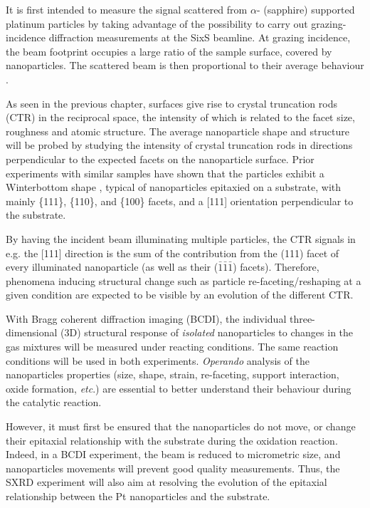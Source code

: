 It is first intended to measure the signal scattered from $\alpha$- (sapphire) supported platinum particles by taking advantage of the possibility to carry out grazing-incidence diffraction measurements at the SixS beamline.
At grazing incidence, the beam footprint occupies a large ratio of the sample surface, covered by nanoparticles.
The scattered beam is then proportional to their average behaviour \parencite{Nolte2008, Hejral2013, Hejral2016}.

As seen in the previous chapter, surfaces give rise to crystal truncation rods (CTR) in the reciprocal space, the intensity of which is related to the facet size, roughness and atomic structure.
The average nanoparticle shape and structure will be probed by studying the intensity of crystal truncation rods in directions perpendicular to the expected facets on the nanoparticle surface.
Prior experiments with similar samples \parencite{Dupraz2017, Li2020, Lim2021, Dupraz2022} have shown that the particles exhibit a Winterbottom shape \parencite{Winterbottom1967, Boukouvala2021}, typical of nanoparticles epitaxied on a substrate, with mainly \{111\}, \{110\}, and \{100\} facets, and a [111] orientation perpendicular to the substrate.

By having the incident beam illuminating multiple particles, the CTR signals in e.g. the [111] direction is the sum of the contribution from the (111) facet of every illuminated nanoparticle (as well as their ($\bar{1}\bar{1}\bar{1}$) facets).
Therefore, phenomena inducing structural change such as particle re-faceting/reshaping at a given condition are expected to be visible by an evolution of the different CTR.

With Bragg coherent diffraction imaging (BCDI), the individual three-dimensional (3D) structural response of \textit{isolated} nanoparticles to changes in the gas mixtures will be measured under reacting conditions.
The same reaction conditions will be used in both experiments.
\textit{Operando} analysis of the nanoparticles properties (size, shape, strain, re-faceting, support interaction, oxide formation, \textit{etc}.) are essential to better understand their behaviour during the catalytic reaction.

However, it must first be ensured that the nanoparticles do not move, or change their epitaxial relationship with the substrate during the oxidation reaction.
Indeed, in a BCDI experiment, the beam is reduced to micrometric size, and nanoparticles movements will prevent good quality measurements.
Thus, the SXRD experiment will also aim at resolving the evolution of the epitaxial relationship between the Pt nanoparticles and the  substrate.

